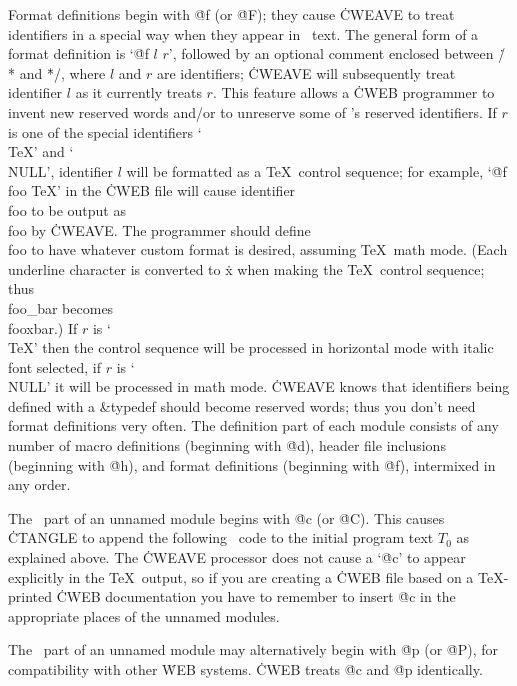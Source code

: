 \@f [\oP,\oT] Format definitions begin with \.{@f} (or \.{@F}); they cause
\.{CWEAVE} to treat identifiers in a special way when they appear in
\Cee\ text. The general form of a format definition is `\.{@f} $l$
$r$', followed by an optional comment enclosed between
\.{/*} and \.{*/}, where $l$ and $r$
are identifiers; \.{CWEAVE} will subsequently treat identifier $l$ as it
currently treats $r$. This feature allows a \.{CWEB} programmer to invent
new reserved words and/or to unreserve some of \Cee's reserved
identifiers. If $r$ is one of the special identifiers `\\{TeX}' and
`\\{NULL}', identifier $l$
will be formatted as a \TeX\ control sequence; for example,
`\.{@f foo TeX}' in the \.{CWEB} file will cause identifier \\{foo} to
be output as \.{\\foo} by \.{CWEAVE}. The programmer should define
\.{\\foo} to have whatever custom format is desired, assuming \TeX\
math mode. (Each underline
character is converted to \.{x} when making the \TeX\ control sequence;
thus \\{foo\_bar} becomes \.{\\fooxbar}.) If $r$ is `\\{TeX}' then the
control sequence will be processed in horizontal mode with italic font
selected, if $r$ is `\\{NULL}' it will be processed in math mode.
\.{CWEAVE} knows that identifiers being
defined with a \&{typedef} should become reserved words; thus you
don't need format definitions very often.
The definition part of each module consists of any number of
macro definitions (beginning with \.{@d}), header file inclusions (beginning
with \.{@h}), and format definitions (beginning
with \.{@f}), intermixed in any order.

\@c [\oP,\oT] The \Cee\ part of an unnamed module begins with \.{@c}
(or \.{@C}). This causes \.{CTANGLE} to append the following \Cee\ code
to the initial program text $T_0$ as explained above. The \.{CWEAVE}
processor does not cause a `\.{@c}' to appear explicitly in the \TeX\
output, so if you are creating a \.{CWEB} file based on a \TeX-printed
\.{CWEB} documentation you have to remember to insert \.{@c} in the
appropriate places of the unnamed modules.

\@p [\oP,\oT] The \Cee\ part of an unnamed module may alternatively begin
with \.{@p} (or \.{@P}), for compatibility with other \.{WEB} systems.
\.{CWEB} treats \.{@c} and \.{@p} identically.

